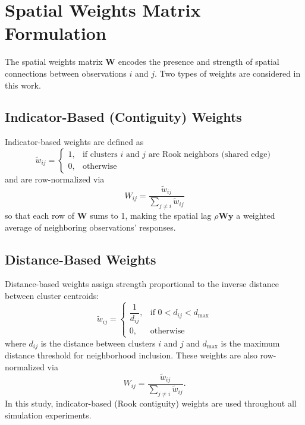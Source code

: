 \documentclass{article}[11pt]
\begin{document}
\section{Spatial Weights Matrix Formulation}\label{appendix:SpatialWeights}

The spatial weights matrix $\mathbf{W}$ encodes the presence and strength of spatial connections between observations $i$ and $j$. Two types of weights are considered in this work.

\subsection*{Indicator-Based (Contiguity) Weights}

Indicator-based weights are defined as
\begin{equation}
    \tilde{w}_{ij} =
    \begin{cases}
        1, & \text{if clusters $i$ and $j$ are Rook neighbors (shared edge)}\\
        0, & \text{otherwise}
    \end{cases}
\end{equation}
and are row-normalized via
\begin{equation}
    W_{ij} = \frac{\tilde{w}_{ij}}{\displaystyle\sum_{j \neq i} \tilde{w}_{ij}}
\end{equation}
so that each row of $\mathbf{W}$ sums to 1, making the spatial lag $\rho\mathbf{Wy}$ a weighted average of neighboring observations' responses.

\subsection*{Distance-Based Weights}

Distance-based weights assign strength proportional to the inverse distance between cluster centroids:
\begin{equation}
    \tilde{w}_{ij} =
    \begin{cases}
        \dfrac{1}{d_{ij}}, & \text{if } 0 < d_{ij} < d_{\max}\\[4pt]
        0, & \text{otherwise}
    \end{cases}
\end{equation}
where $d_{ij}$ is the distance between clusters $i$ and $j$ and $d_{\max}$ is the maximum distance threshold for neighborhood inclusion. These weights are also row-normalized via
\begin{equation}
    W_{ij} = \frac{\tilde{w}_{ij}}{\displaystyle\sum_{j \neq i}\tilde{w}_{ij}}.
\end{equation}
In this study, indicator-based (Rook contiguity) weights are used throughout all simulation experiments.
\end{document}
